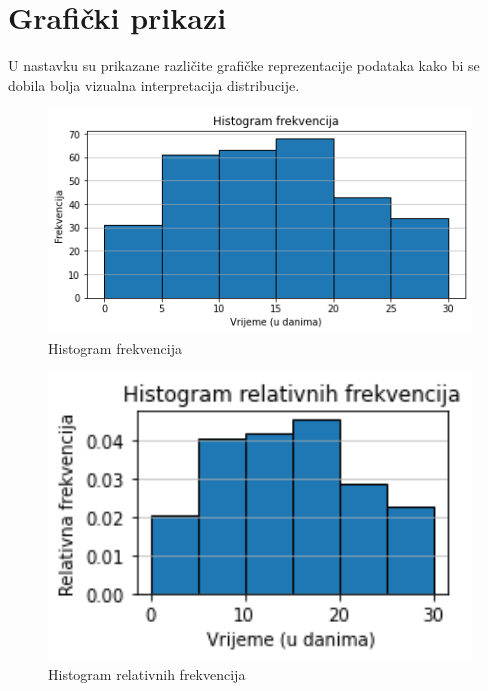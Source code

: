 \section{Grafički prikazi}

U nastavku su prikazane različite grafičke reprezentacije podataka kako bi se dobila bolja vizualna interpretacija distribucije.

\begin{figure}[H]
\centering
\includegraphics[width=1\textwidth]{assets/histogram_frekvencija.png}
\caption{Histogram frekvencija}
\end{figure}

\begin{figure}[H]
\centering
\includegraphics[width=1\textwidth]{assets/histogram_relativnih_frekvencija.png}
\caption{Histogram relativnih frekvencija}
\end{figure}

